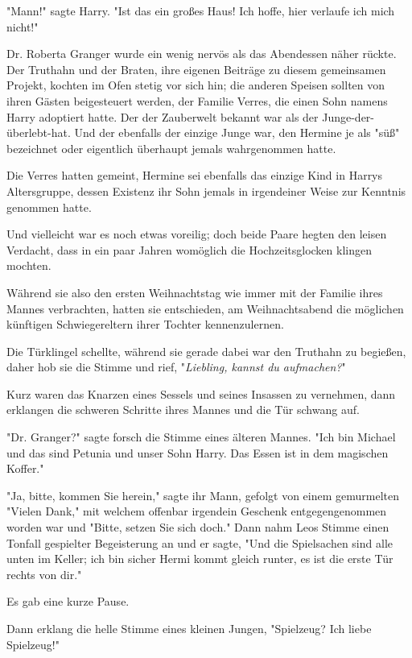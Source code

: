 {"Mann!" sagte Harry. "Ist das ein großes Haus! Ich hoffe, hier verlaufe ich mich nicht!"

\later

Dr. Roberta Granger wurde ein wenig nervös als das Abendessen näher rückte. Der Truthahn und der Braten, ihre eigenen Beiträge zu diesem gemeinsamen Projekt, kochten im Ofen stetig vor sich hin; die anderen Speisen sollten von ihren Gästen beigesteuert werden, der Familie Verres, die einen Sohn namens Harry adoptiert hatte. Der der Zauberwelt bekannt war als der Junge-der-überlebt-hat. Und der ebenfalls der einzige Junge war, den Hermine je als "süß" bezeichnet oder eigentlich überhaupt jemals wahrgenommen hatte.

Die Verres hatten gemeint, Hermine sei ebenfalls das einzige Kind in Harrys Altersgruppe, dessen Existenz ihr Sohn jemals in irgendeiner Weise zur Kenntnis genommen hatte.

Und vielleicht war es noch etwas voreilig; doch beide Paare hegten den leisen Verdacht, dass in ein paar Jahren womöglich die Hochzeitsglocken klingen mochten.

Während sie also den ersten Weihnachtstag wie immer mit der Familie ihres Mannes verbrachten, hatten sie entschieden, am Weihnachtsabend die möglichen künftigen Schwiegereltern ihrer Tochter kennenzulernen.

Die Türklingel schellte, während sie gerade dabei war den Truthahn zu begießen, daher hob sie die Stimme und rief, "\emph{Liebling, kannst du aufmachen?}"

Kurz waren das Knarzen eines Sessels und seines Insassen zu vernehmen, dann erklangen die schweren Schritte ihres Mannes und die Tür schwang auf.

"Dr. Granger?" sagte forsch die Stimme eines älteren Mannes. "Ich bin Michael und das sind Petunia und unser Sohn Harry. Das Essen ist in dem magischen Koffer."

"Ja, bitte, kommen Sie herein," sagte ihr Mann, gefolgt von einem gemurmelten "Vielen Dank," mit welchem offenbar irgendein Geschenk entgegengenommen worden war und "Bitte, setzen Sie sich doch." Dann nahm Leos Stimme einen Tonfall gespielter Begeisterung an und er sagte, "Und die Spielsachen sind alle unten im Keller; ich bin sicher Hermi kommt gleich runter, es ist die erste Tür rechts von dir."

Es gab eine kurze Pause.

Dann erklang die helle Stimme eines kleinen Jungen, "Spielzeug? Ich liebe Spielzeug!"

}
